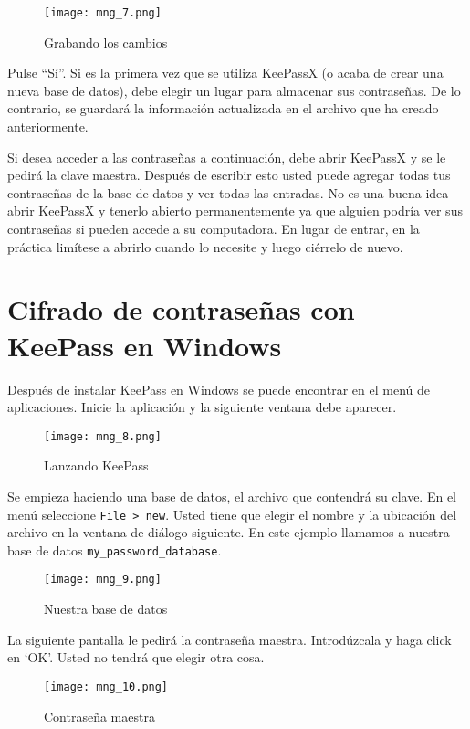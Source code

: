 \documentclass[10pt,a5paper,twoside,,]{book}
\begin{document}
\begin{figure}[htbp]
\centering
\texttt{[image: mng\_7.png]}
\caption{Grabando los cambios}
\end{figure}

Pulse ``Sí''. Si es la primera vez que se utiliza KeePassX (o acaba de
crear una nueva base de datos), debe elegir un lugar para almacenar sus
contraseñas. De lo contrario, se guardará la información actualizada en
el archivo que ha creado anteriormente.

Si desea acceder a las contraseñas a continuación, debe abrir KeePassX y
se le pedirá la clave maestra. Después de escribir esto usted puede
agregar todas tus contraseñas de la base de datos y ver todas las
entradas. No es una buena idea abrir KeePassX y tenerlo abierto
permanentemente ya que alguien podría ver sus contraseñas si pueden
accede a su computadora. En lugar de entrar, en la práctica limítese a
abrirlo cuando lo necesite y luego ciérrelo de nuevo.

\section{Cifrado de contraseñas con KeePass en
Windows}\label{cifrado-de-contraseuxf1as-con-keepass-en-windows}

Después de instalar KeePass en Windows se puede encontrar en el menú de
aplicaciones. Inicie la aplicación y la siguiente ventana debe aparecer.

\begin{figure}[htbp]
\centering
\texttt{[image: mng\_8.png]}
\caption{Lanzando KeePass}
\end{figure}

Se empieza haciendo una base de datos, el archivo que contendrá su
clave. En el menú seleccione \texttt{File\ \textgreater{}\ new}. Usted
tiene que elegir el nombre y la ubicación del archivo en la ventana de
diálogo siguiente. En este ejemplo llamamos a nuestra base de datos
\texttt{my\_password\_database}.

\begin{figure}[htbp]
\centering
\texttt{[image: mng\_9.png]}
\caption{Nuestra base de datos}
\end{figure}

La siguiente pantalla le pedirá la contraseña maestra. Introdúzcala y
haga click en `OK'. Usted no tendrá que elegir otra cosa.

\begin{figure}[htbp]
\centering
\texttt{[image: mng\_10.png]}
\caption{Contraseña maestra}
\end{figure}
\end{document}
